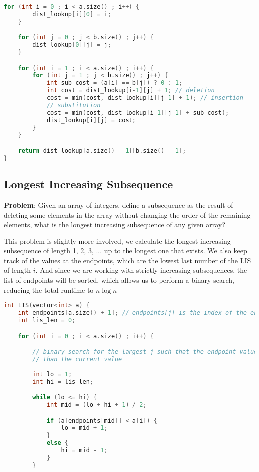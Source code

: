 \documentclass[12 pt, twoside] {article}
\begin{document}
{\begin{lstlisting}[language=C++]
    for (int i = 0 ; i < a.size() ; i++) {
        dist_lookup[i][0] = i;
    }

    for (int j = 0 ; j < b.size() ; j++) {
        dist_lookup[0][j] = j;
    }

    for (int i = 1 ; i < a.size() ; i++) {
        for (int j = 1 ; j < b.size() ; j++) {
            int sub_cost = (a[i] == b[j]) ? 0 : 1;
            int cost = dist_lookup[i-1][j] + 1; // deletion
            cost = min(cost, dist_lookup[i][j-1] + 1); // insertion
            // substitution
            cost = min(cost, dist_lookup[i-1][j-1] + sub_cost);
            dist_lookup[i][j] = cost;
        }
    }

    return dist_lookup[a.size() - 1][b.size() - 1];
}
\end{lstlisting}

\subsection*{Longest Increasing Subsequence}

\textbf{Problem}: Given an array of integers, define a subsequence as the result
of deleting some elements in the array without changing the order of the
remaining elements, what is the longest increasing subsequence of any given
array?

This problem is slightly more involved, we calculate the longest increasing
subsequence of length 1, 2, 3, ... up to the longest one that exists. We also
keep track of the values at the endpoints, which are the lowest last number of
the LIS of length $i$. And since we are working with strictly increasing
subsequences, the list of endpoints will be sorted, which allows us to perform a
binary search, reducing the total runtime to $n \log n$

\begin{lstlisting}[language=C++]
int LIS(vector<int> a) {
    int endpoints[a.size() + 1]; // endpoints[j] is the index of the endpoint of lis of length j
    int lis_len = 0;

    for (int i = 0 ; i < a.size() ; i++) {

        // binary search for the largest j such that the endpoint value is less
        // than the current value
        
        int lo = 1;
        int hi = lis_len;

        while (lo <= hi) {
            int mid = (lo + hi + 1) / 2;

            if (a[endpoints[mid]] < a[i]) {
                lo = mid + 1;
            }
            else {
                hi = mid - 1;
            }
        }


\end{lstlisting}}
\end{document}
